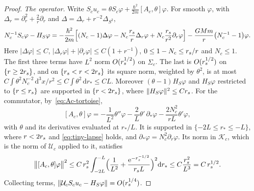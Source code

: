 \documentclass[10pt,a4paper]{amsart}
\theoremstyle{definition}
\theoremstyle{remark}
\newcommand{\K}{\mathcal{K}}
\newcommand{\rmd}{\mathrm{d}}
\newcommand{\rme}{\mathrm{e}}
\begin{document}
\begin{proof}
\emph{The operator.} Write $S_cu_c=\theta S_c\varphi+\frac{\hbar^2}{2m}
[A_c,\theta]\varphi$. For smooth $\varphi$, with $\Delta_r=\partial_r^2+
\frac2r\partial_r$ and $\Delta=\Delta_r+r^{-2}\Delta_{S^2}$,
\[
N_c^{-1}S_c\varphi-H_S\varphi=-\frac{\hbar^2}{2m}\Bigl[(N_c-1)\Delta
\varphi-N_c\frac{r_{\rm s}}{r}\Delta_r\varphi+N_c\frac{r_{\rm s}}{r^2}
\partial_r\varphi\Bigr]-\frac{GMm}{r}\bigl(N_c^{-1}-1\bigr)\varphi .
\]
Here $|\Delta\varphi|\leq C$, $|\Delta_r\varphi|+|\partial_r\varphi|
\leq C(1+r^{-1})$, $0\leq1-N_c\leq r_{\rm s}/r$ and $N_c\leq1$. The
first three terms have $L^2$ norm $O(r_{\rm s}^{1/2})$ on $\Sigma_c$. The
last is $O(r_{\rm s}^{1/2})$ on $\{r\geq2r_{\rm s}\}$, and on
$\{r_{\rm s}<r<2r_{\rm s}\}$ its square norm, weighted by $\theta^2$, is
at most $C\int\theta^2N_c^{-2}\,\rmd^3x/r^2\leq C\int\theta^2\,\rmd r_*
\leq CL$. Moreover $(\theta-1)H_S\varphi$ and $H_S\varphi$ restricted to
$\{r\leq r_{\rm s}\}$ are supported in $\{r<2r_{\rm s}\}$, where
$\|H_S\varphi\|^2\leq Cr_{\rm s}$. For the commutator,
by~\eqref{eq:Ac-tortoise},
\[
[A_c,\theta]\varphi=-\frac{1}{L^2}\theta''\varphi-\frac2L\theta'\,
\partial_*\varphi-\frac{2N_c^2}{rL}\theta'\varphi,
\]
with $\theta$ and its derivatives evaluated at $r_*/L$. It is supported
in $\{-2L\leq r_*\leq-L\}$, where $r<2r_{\rm s}$ and
\eqref{eq:tiny-lapse} holds, and $\partial_*\varphi=N_c^2\partial_r
\varphi$. Its norm in $\K_c$, which is the norm of $\mathcal{U}_c$
applied to it, satisfies
\[
\bigl\|[A_c,\theta]\varphi\bigr\|^2\leq C\,r_{\rm s}^2\int_{-2L}^{-L}
\Bigl(\frac{1}{L^2}+\frac{\rme^{-r_{\rm s}^{-1/2}}}{r_{\rm s}L}\Bigr)^2
\rmd r_*\leq C\frac{r_{\rm s}^2}{L^3}=C\,r_{\rm s}^{1/2}.
\]
Collecting terms, $\|\mathcal{U}_cS_cu_c-H_S\varphi\|=O(r_{\rm s}^{1/4})$.
\end{proof}
\end{document}
